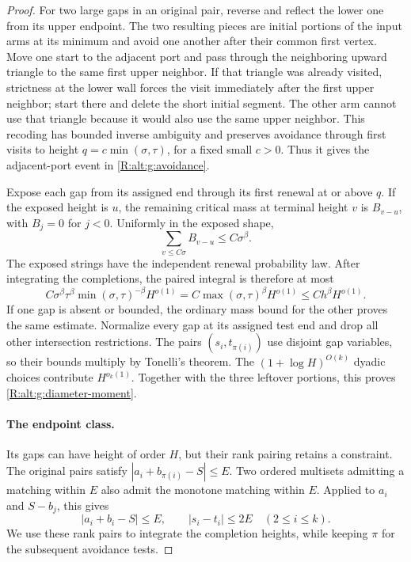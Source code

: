 \begin{proof}
For two large gaps in an original pair, reverse and reflect the lower
one from its upper endpoint. The two resulting pieces are initial
portions of the input arms at its minimum and avoid one another after
their common first vertex. Move one start to the adjacent port and pass
through the neighboring upward triangle to the same first upper
neighbor. If that triangle was already visited, strictness at the lower
wall forces the visit immediately after the first upper neighbor;
start there and delete the short initial segment. The other arm cannot
use that triangle because it would also use the same upper neighbor.
This recoding has bounded inverse ambiguity and preserves avoidance
through first visits to height $q=c\min(\sigma,\tau)$, for a fixed small
$c>0$. Thus it gives the adjacent-port event in
\eqref{R:alt:g:avoidance}.

Expose each gap from its assigned end through its first renewal at or
above $q$. If the exposed height is $u$, the remaining critical mass
at terminal height $v$ is $B_{v-u}$, with $B_j=0$ for $j<0$. Uniformly
in the exposed shape,
\[
 \sum_{v\le C\sigma}B_{v-u}\le C\sigma^\beta.
\]
The exposed strings have the independent renewal probability law.
After integrating the completions, the paired integral is therefore at
most
\[
 C\sigma^\beta\tau^\beta\min(\sigma,\tau)^{-\beta}H^{o(1)}
 =C\max(\sigma,\tau)^\beta H^{o(1)}
 \le Ch^\beta H^{o(1)}.
\]
If one gap is absent or bounded, the ordinary mass bound for the other
proves the same estimate. Normalize every gap at its assigned test end
and drop all other intersection restrictions. The pairs
$(s_i,t_{\pi(i)})$ use disjoint gap variables, so their bounds multiply
by Tonelli's theorem. The $(1+\log H)^{O(k)}$ dyadic choices contribute
$H^{o_k(1)}$. Together with the three leftover portions, this proves
\eqref{R:alt:g:diameter-moment}.

\paragraph{The endpoint class.}
Its gaps can have height of order $H$, but their rank pairing retains a
constraint. The original pairs satisfy
$|a_i+b_{\pi(i)}-S|\le E$. Two ordered multisets admitting a matching
within $E$ also admit the monotone matching within $E$. Applied to
$a_i$ and $S-b_j$, this gives
\[
 |a_i+b_i-S|\le E,\qquad |s_i-t_i|\le2E\quad(2\le i\le k).
\]
We use these rank pairs to integrate the completion heights, while
keeping $\pi$ for the subsequent avoidance tests.


\end{proof}
